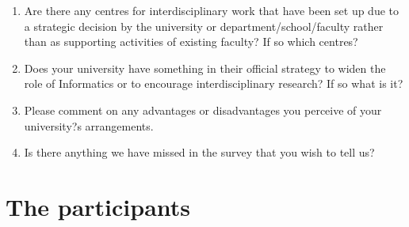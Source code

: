 \begin{enumerate}
\begin{enumerate}
\item Are there any centres for interdisciplinary work that have been set
up due to a strategic decision by the university or
department/school/faculty rather than as supporting activities of
existing faculty? If so which centres?
\item Does your university have something in their official strategy to
widen the role of Informatics or to encourage interdisciplinary
research? If so what is it?
\item Please comment on any advantages or disadvantages you perceive of your university?s arrangements.
\item Is there anything we have missed in the survey that you wish to tell us?
\end{enumerate}
\end{enumerate}
\newpage
\section{The participants}\label{apx:names}
